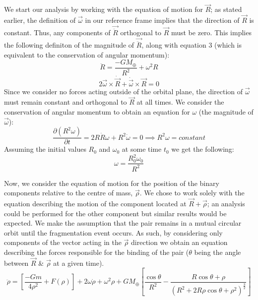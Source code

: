 \documentclass[letterpaper, preprint, paper,11pt]{AAS}	%
\begin{document}
We start our analysis by working with the equation of motion for $\vec{R}$; as stated earlier, the definition of $\vec{\omega}$ in our reference frame implies that the direction of $\vec{R}$ is constant. Thus, any components of $\vec{\ddot{R}}$ orthogonal to $\vec{R}$ must be zero. This implies the following definiton of the magnitude of $\vec{\ddot{R}}$, along with equation 3 (which is equivalent to the conservation of angular momentum): 
\begin{equation}
\ddot{R} = \frac{-GM_\oplus}{R^{2}}+\omega^{2}R
\end{equation}
\begin{equation}
2\vec{\omega}\times\dot{\vec{R}}+\dot{\vec{\omega}}\times\vec{R}=0
\end{equation}
Since we consider no forces acting outside of the orbital plane, the direction of $\vec{\omega}$ must remain constant and orthogonal to $\vec{R}$ at all times. We consider the conservation of angular momentum to obtain an equation for $\omega$ (the magnitude of $\vec{\omega}$):
\begin{equation}
\frac{\partial\left(R^{2}\omega\right)}{\partial t} = 2R\dot{R}\omega + R^{2}\dot{\omega} = 0 \implies R^{2}\omega = constant
\end{equation}
Assuming the initial values $R_0$ and $\omega_0$ at some time $t_0$ we get the following:
\begin{equation}
\omega = \frac{R_0^{2}\omega_0}{R^{2}}
\end{equation}

Now, we consider the equation of motion for the position of the binary components relative to the centre of mass, $\vec{\rho}$. We chose to work solely with the equation describing the motion of the component located at $\vec{R}+\vec{\rho}$; an analysis could be performed for the other component but similar results would be expected. We make the assumption that the pair remains in a mutual circular orbit until the fragmentation event occurs. As such, by considering only components of the vector acting in the $\vec{\rho}$ direction we obtain an equation describing the forces responsible for the binding of the pair ($\theta$ being the angle between $\vec{R}$ \& $\vec{\rho}$ at a given time).
\begin{equation}\label{eq:rdd}
\ddot{\rho} = \left[\frac{-Gm}{4\rho^{2}}+F(\rho)\right]+2\omega\dot{\rho}+\omega^{2}\rho+{GM_\oplus}\left[\frac{\cos\theta}{R^{2}}-\frac{R\cos\theta+\rho}{(R^{2}+2R\rho\cos\theta+\rho^{2})^\frac{3}{2}}\right]
\end{equation}
\end{document}
